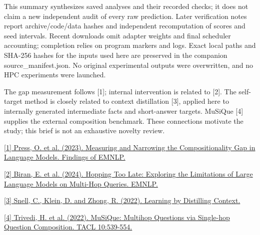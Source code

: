\documentclass[11pt,a4paper]{article}
\newcommand{\reportheading}[1]{\par\vspace{5pt}{\color{teal}\bfseries\large #1}\par\vspace{2pt}}
\begin{document}
{\small\color{muted} This summary synthesizes saved analyses and their recorded checks; it does not claim a new independent audit of every raw prediction. Later verification notes report archive/code/data hashes and independent recomputation of scores and seed intervals. Recent downloads omit adapter weights and final scheduler accounting; completion relies on program markers and logs. Exact local paths and SHA-256 hashes for the inputs used here are preserved in the companion source\_manifest.json. No original experimental outputs were overwritten, and no HPC experiments were launched.\par}
\reportheading{Position in the literature}
{\small\color{muted} The gap measurement follows [1]; internal intervention is related to [2]. The self-target method is closely related to context distillation [3], applied here to internally generated intermediate facts and short-answer targets. MuSiQue [4] supplies the external composition benchmark. These connections motivate the study; this brief is not an exhaustive novelty review.\par}
{\small\color{muted} \href{https://aclanthology.org/2023.findings-emnlp.378/}{[1] Press, O. et al. (2023). Measuring and Narrowing the Compositionality Gap in Language Models. Findings of EMNLP.}\par}
{\small\color{muted} \href{https://arxiv.org/abs/2406.12775}{[2] Biran, E. et al. (2024). Hopping Too Late: Exploring the Limitations of Large Language Models on Multi-Hop Queries. EMNLP.}\par}
{\small\color{muted} \href{https://arxiv.org/abs/2209.15189}{[3] Snell, C., Klein, D. and Zhong, R. (2022). Learning by Distilling Context.}\par}
{\small\color{muted} \href{https://aclanthology.org/2022.tacl-1.31/}{[4] Trivedi, H. et al. (2022). MuSiQue: Multihop Questions via Single-hop Question Composition. TACL 10:539-554.}\par}
\end{document}
